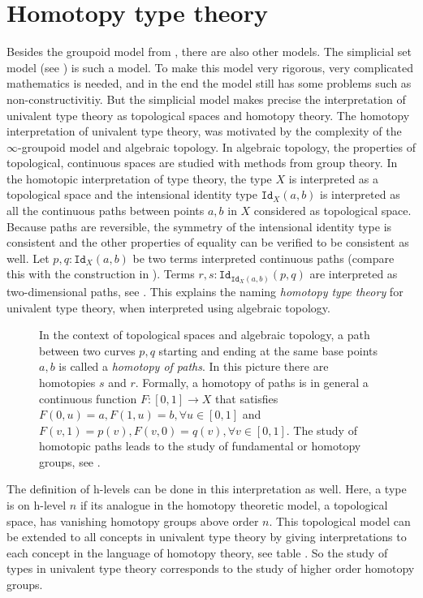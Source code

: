 \documentclass[12pt,a4paper,twoside,xetex]{book} %
\newcommand{\keyword}[1]{\emph{#1}\index{#1}}
\newcommand{\op}[1]{\mathtt{#1}}
\begin{document}
\section{Homotopy type theory}\label{homotopicinterp}

Besides the groupoid model from , there are also other 
models. The simplicial set model (see ) is such a model. To make this model very rigorous, very complicated mathematics is needed, and in the end the model still has some problems such as non-constructivitiy. But the simplicial model makes precise the interpretation of univalent type theory as topological spaces and homotopy theory. The homotopy interpretation of univalent type theory, 
was motivated by the complexity of the $\infty$-groupoid model and algebraic 
topology. In algebraic topology, the properties of topological, continuous 
spaces are studied with methods from group theory. In the homotopic 
interpretation of type theory, the type $X$ is interpreted as a topological 
space and the intensional identity type $\op{Id}_X(a,b)$ is interpreted as all 
the continuous paths between points $a,b$ in $X$ considered as topological 
space. Because paths are reversible, the symmetry of the intensional identity 
type is consistent and the other properties of equality can be verified to be 
consistent as well. Let $p,q: \op{Id}_X(a,b)$ be two terms interpreted 
continuous paths (compare this with the construction in ). 
Terms $r,s:\op{Id}_{\op{Id}_X(a,b)}(p,q)$ are interpreted as two-dimensional 
paths, see . This explains the naming \keyword{homotopy 
type theory} for univalent type theory, when interpreted using algebraic 
topology. 

\begin{figure}\label{simplehomotopy}
\centering

\caption{In the context of topological spaces and algebraic topology, a path 
between two curves $p,q$ starting and ending at the same base points $a,b$ is 
called a \keyword{homotopy of paths}. In this picture there are homotopies $s$ 
and $r$. Formally, a homotopy of paths is in general a continuous function $F: 
[0,1] \rightarrow  X$ that satisfies $F(0,u) = a, F(1,u)=b, \forall u \in 
[0,1]$ and $F(v,1)=p(v), F(v,0)=q(v), \forall v \in [0,1]$. The study of 
homotopic paths leads to the study of fundamental or homotopy groups, see 
. }
\end{figure}

The definition of h-levels can be done in this interpretation as well. Here, a 
type is on h-level $n$ if its analogue in the homotopy theoretic model, a 
topological space, has vanishing homotopy groups above order $n$. This 
topological model can be extended to all concepts in univalent type theory by 
giving interpretations to each concept in the language of homotopy theory, see 
table . So the study of types in 
univalent type theory corresponds to the study of higher order homotopy groups.
\end{document}

